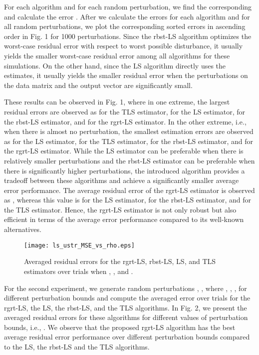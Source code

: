 \documentclass[review,sort&compress]{elsarticle}
\begin{document}
For each algorithm and for each random perturbation, we find the corresponding  and calculate the error . After we calculate the errors for each algorithm and for all random perturbations, we plot the corresponding sorted errors in ascending order in Fig. 1 for 1000 perturbations. Since the rbst-LS algorithm optimizes the worst-case residual error with respect to worst possible disturbance, it usually yields the smaller worst-case residual error among all algorithms for these simulations. On the other hand, since the LS algorithm directly uses the estimates, it usually yields the smaller residual error when the perturbations on the data matrix and the output vector are significantly small.

These results can be observed in Fig. 1, where in one extreme, the largest residual errors are observed as  for the TLS estimator,  for the LS estimator,  for the rbst-LS estimator, and  for the rgrt-LS estimator. In the other extreme, i.e., when there is almost no perturbation, the smallest estimation errors are observed as  for the LS estimator,  for the TLS estimator,  for the rbst-LS estimator, and  for the rgrt-LS estimator. While the LS estimator can be preferable when there is relatively smaller perturbations and the rbst-LS estimator can be preferable when there is significantly higher perturbations, the introduced algorithm provides a tradeoff between these algorithms and achieve a significantly smaller average error performance. The average residual error of the rgrt-LS estimator is observed as , whereas this value is  for the LS estimator,  for the rbst-LS estimator, and  for the TLS estimator. Hence, the rgrt-LS estimator is not only robust but also efficient in terms of the average error performance compared to its well-known alternatives.

\begin{figure}[t]
  \centering
  \texttt{[image: ls\_ustr\_MSE\_vs\_rho.eps]}\\
  \caption{Averaged residual errors for the rgrt-LS, rbst-LS, LS, and TLS estimators over  trials when , , and .}\label{fig:ls_ustr_MSE_vs_rho}
\end{figure}

For the second experiment, we generate  random perturbations , , where , , ,  for different perturbation bounds and compute the averaged error over  trials for the rgrt-LS, the LS, the rbst-LS, and the TLS algorithms. In Fig. 2, we present the averaged residual errors for these algorithms for different values of perturbation bounds, i.e., . We observe that the proposed rgrt-LS algorithm has the best average residual error performance over different perturbation bounds compared to the LS, the rbst-LS and the TLS algorithms.
\end{document}
